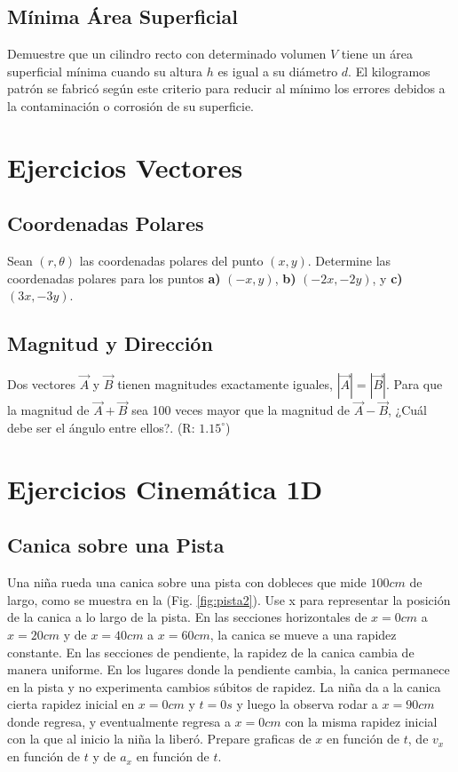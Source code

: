 \documentclass{replab}
\begin{document}
\subsection{Mínima Área Superficial}
Demuestre que un cilindro recto con determinado volumen $V$ tiene un área superficial mínima cuando su altura $h$ es igual a su diámetro $d$. El kilogramos patrón se fabricó según este criterio para reducir al mínimo los errores debidos a la contaminación o corrosión de su superficie. 

\section{Ejercicios Vectores}

\subsection{Coordenadas Polares}
Sean $(r,\theta)$ las coordenadas polares del punto $(x,y)$. Determine las coordenadas polares para los puntos \textbf{a)} $(-x,y)$, \textbf{b)} $(-2x,-2y)$, y \textbf{c)} $(3x,-3y)$.

\subsection{Magnitud y Dirección}
Dos vectores $\vec{A}$ y $\vec{B}$ tienen magnitudes exactamente iguales, $|\vec{A}| = |\vec{B}|$. Para que la magnitud de $\vec{A} + \vec{B}$ sea 100 veces mayor que la magnitud de $\vec{A} - \vec{B}$, ¿Cuál debe ser el ángulo entre ellos?. (R: $1.15^\circ$)

\section{Ejercicios Cinemática 1D}

\subsection{Canica sobre una Pista}
Una niña rueda una canica sobre una pista con dobleces que mide $100cm$ de largo, como se muestra en la (Fig. \ref{fig:pista2}). Use x para representar la posición de la canica a lo largo de la pista. En las secciones horizontales de $x=0cm$ a $x=20cm$ y de $x=40cm$ a $x=60cm$, la canica se mueve a una rapidez constante. En las secciones de pendiente, la rapidez de la canica cambia de manera uniforme. En los lugares donde la pendiente cambia, la canica permanece en la pista y no experimenta cambios súbitos de rapidez. La niña da a la canica cierta rapidez inicial en $x=0cm$ y $t=0s$ y luego la observa rodar a $x=90cm$ donde regresa, y eventualmente regresa a $x=0cm$ con la misma rapidez inicial con la que al inicio la niña la liberó. Prepare graficas de $x$ en función de $t$, de $v_x$ en función de $t$ y de $a_x$ en función de $t$. 
	
\end{document}
